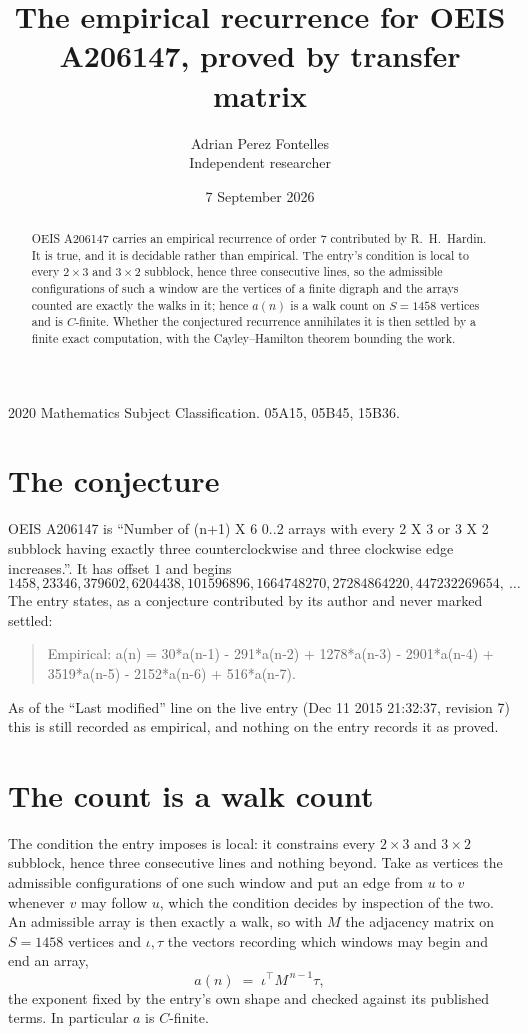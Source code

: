 \documentclass[11pt,a4paper]{article}
\title{The empirical recurrence for OEIS A206147, proved by transfer matrix}
\author{Adrian Perez Fontelles\\ \small Independent researcher}
\date{7 September 2026}
\theoremstyle{plain}
\theoremstyle{definition}
\begin{document}
\maketitle

\begin{abstract}
OEIS A206147 carries an empirical recurrence of order $7$ contributed by R.~H.~Hardin. It is
true, and it is decidable rather than empirical. The entry's condition is local to every $2\times3$ and $3\times2$ subblock, hence three consecutive lines, so
the admissible configurations of such a window are the vertices of a finite digraph and the
arrays counted are exactly the walks in it; hence $a(n)$ is a walk count on $S=1458$ vertices
and is $C$-finite. Whether the conjectured recurrence annihilates it is then settled by a
finite exact computation, with the Cayley--Hamilton theorem bounding the work.
\end{abstract}

\noindent\small 2020 Mathematics Subject Classification. 05A15, 05B45, 15B36.\normalsize

\section{The conjecture}

OEIS A206147 is ``Number of (n+1) X 6 0..2 arrays with every 2 X 3 or 3 X 2 subblock having exactly three counterclockwise and three clockwise edge increases.''. It has offset $1$ and begins
\[
1458, 23346, 379602, 6204438, 101596896, 1664748270, 27284864220, 447232269654,\ \dots
\]
The entry states, as a conjecture contributed by its author and never marked settled:
\begin{quote}
Empirical: a(n) = 30*a(n-1) - 291*a(n-2) + 1278*a(n-3) - 2901*a(n-4) + 3519*a(n-5) - 2152*a(n-6) + 516*a(n-7).
\end{quote}
As of the ``Last modified'' line on the live entry (Dec 11 2015 21:32:37, revision 7) this is still
recorded as empirical, and nothing on the entry records it as proved.

\section{The count is a walk count}

The condition the entry imposes is local: it constrains every $2\times3$ and $3\times2$ subblock, hence three consecutive lines and nothing beyond. Take as
vertices the admissible configurations of one such window and put an edge from $u$ to $v$
whenever $v$ may follow $u$, which the condition decides by inspection of the two. An
admissible array is then exactly a walk, so with $M$ the adjacency matrix on $S=1458$ vertices
and $\iota,\tau$ the vectors recording which windows may begin and end an array,
\[
a(n)\;=\;\iota^{\!\top}M^{\,n-1}\tau ,
\]
the exponent fixed by the entry's own shape and checked against its published terms. In
particular $a$ is $C$-finite.
\end{document}
